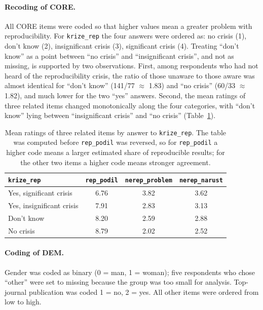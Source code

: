 \documentclass[11pt,a4paper]{article}
\newcommand{\var}[1]{\texttt{#1}}
\begin{document}
\paragraph{Recoding of CORE.}
All CORE items were coded so that higher values mean a greater problem with reproducibility. For \var{krize\_rep} the four answers were ordered as: no crisis (1), don't know (2), insignificant crisis (3), significant crisis (4). Treating ``don't know'' as a point between ``no crisis'' and ``insignificant crisis'', and not as missing, is supported by two observations. First, among respondents who had not heard of the reproducibility crisis, the ratio of those unaware to those aware was almost identical for ``don't know'' (141/77 $\approx$ 1.83) and ``no crisis'' (60/33 $\approx$ 1.82), and much lower for the two ``yes'' answers. Second, the mean ratings of three related items changed monotonically along the four categories, with ``don't know'' lying between ``insignificant crisis'' and ``no crisis'' (Table~\ref{tab:dontknow}).

\begin{table}[ht]
\centering
\small
\begin{tabular}{@{}l c c c@{}}
\toprule
\var{krize\_rep} & \var{rep\_podil} & \var{nerep\_problem} & \var{nerep\_narust}\\
\midrule
Yes, significant crisis   & 6.76 & 3.82 & 3.62\\
Yes, insignificant crisis & 7.91 & 2.83 & 3.13\\
Don't know                & 8.20 & 2.59 & 2.88\\
No crisis                 & 8.79 & 2.02 & 2.52\\
\bottomrule
\end{tabular}
\caption{Mean ratings of three related items by answer to \var{krize\_rep}. The table was computed before \var{rep\_podil} was reversed, so for \var{rep\_podil} a higher code means a larger estimated share of reproducible results; for the other two items a higher code means stronger agreement.}
\label{tab:dontknow}
\end{table}

\paragraph{Coding of DEM.}
Gender was coded as binary (0 = man, 1 = woman); five respondents who chose ``other'' were set to missing because the group was too small for analysis. Top-journal publication was coded 1 = no, 2 = yes. All other items were ordered from low to high.
\end{document}
